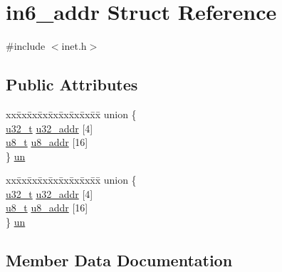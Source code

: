 \hypertarget{structin6__addr}{}\section{in6\+\_\+addr Struct Reference}
\label{structin6__addr}


{\ttfamily \#include $<$inet.\+h$>$}

\subsection*{Public Attributes}
\begin{DoxyCompactItemize}
\item 
\begin{tabbing}
xx\=xx\=xx\=xx\=xx\=xx\=xx\=xx\=xx\=\kill
union \{\\
\>\hyperlink{group__compiler__abstraction_ga4c14294869aceba3ef9d4c0c302d0f33}{u32\_t} \hyperlink{structin6__addr_a5a2ca960bb7ff446cb8ca70478843cdd}{u32\_addr} \mbox{[}4\mbox{]}\\
\>\hyperlink{group__compiler__abstraction_ga4caecabca98b43919dd11be1c0d4cd8e}{u8\_t} \hyperlink{structin6__addr_abfef295d9dd6db109a1f1f95eacdb5f6}{u8\_addr} \mbox{[}16\mbox{]}\\
\} \hyperlink{structin6__addr_ada825f4d581cfaae6c93a83412716971}{un}\\

\end{tabbing}\item 
\begin{tabbing}
xx\=xx\=xx\=xx\=xx\=xx\=xx\=xx\=xx\=\kill
union \{\\
\>\hyperlink{group__compiler__abstraction_ga4c14294869aceba3ef9d4c0c302d0f33}{u32\_t} \hyperlink{structin6__addr_a5a2ca960bb7ff446cb8ca70478843cdd}{u32\_addr} \mbox{[}4\mbox{]}\\
\>\hyperlink{group__compiler__abstraction_ga4caecabca98b43919dd11be1c0d4cd8e}{u8\_t} \hyperlink{structin6__addr_abfef295d9dd6db109a1f1f95eacdb5f6}{u8\_addr} \mbox{[}16\mbox{]}\\
\} \hyperlink{structin6__addr_a3dd07f97c984fbda022a9b42301e3692}{un}\\

\end{tabbing}\end{DoxyCompactItemize}


\subsection{Member Data Documentation}
\mbox{\label{structin6__addr_a5a2ca960bb7ff446cb8ca70478843cdd}} 
